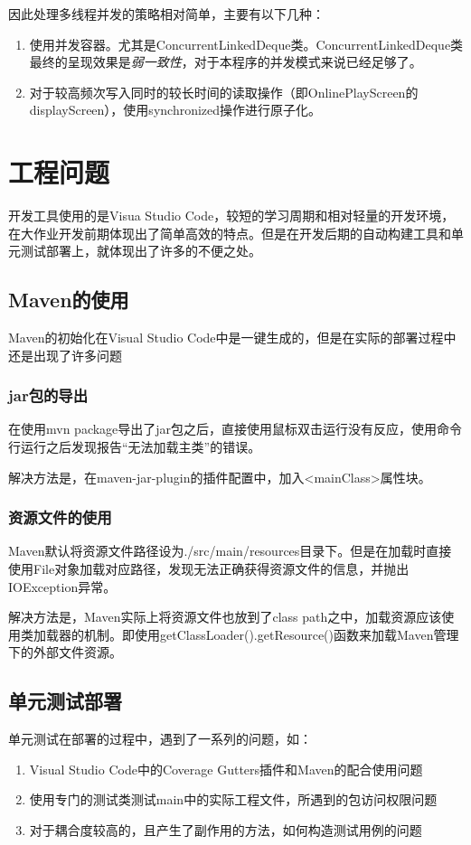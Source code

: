 \documentclass{SCIS2022cn}
\begin{document}
因此处理多线程并发的策略相对简单，主要有以下几种：
\begin{enumerate}
    \item 使用并发容器。尤其是ConcurrentLinkedDeque类。ConcurrentLinkedDeque类最终的呈现效果是\emph{弱一致性}，对于本程序的并发模式来说已经足够了。
    \item 对于较高频次写入同时的较长时间的读取操作（即OnlinePlayScreen的displayScreen），使用synchronized操作进行原子化。
\end{enumerate}

\section{工程问题}
开发工具使用的是Visua Studio Code，较短的学习周期和相对轻量的开发环境，在大作业开发前期体现出了简单高效的特点。但是在开发后期的自动构建工具和单元测试部署上，就体现出了许多的不便之处。

\subsection{Maven的使用}
Maven的初始化在Visual Studio Code中是一键生成的，但是在实际的部署过程中还是出现了许多问题
\subsubsection{jar包的导出}
在使用mvn package导出了jar包之后，直接使用鼠标双击运行没有反应，使用命令行运行之后发现报告“无法加载主类”的错误。

解决方法是，在maven-jar-plugin的插件配置中，加入<mainClass>属性块。

\subsubsection{资源文件的使用}
Maven默认将资源文件路径设为./src/main/resources目录下。但是在加载时直接使用File对象加载对应路径，发现无法正确获得资源文件的信息，并抛出IOException异常。

解决方法是，Maven实际上将资源文件也放到了class path之中，加载资源应该使用类加载器的机制。即使用getClassLoader().getResource()函数来加载Maven管理下的外部文件资源。

\subsection{单元测试部署}
单元测试在部署的过程中，遇到了一系列的问题，如：
\begin{enumerate}
    \item Visual Studio Code中的Coverage Gutters插件和Maven的配合使用问题
    \item 使用专门的测试类测试main中的实际工程文件，所遇到的包访问权限问题
    \item 对于耦合度较高的，且产生了副作用的方法，如何构造测试用例的问题
\end{enumerate}
\end{document}
